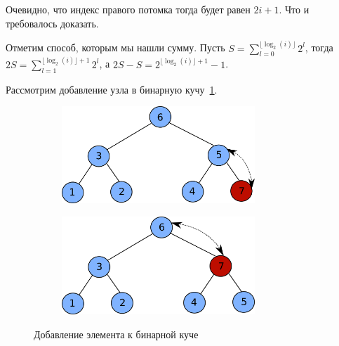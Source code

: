 Очевидно, что индекс правого потомка тогда будет равен $2i+1$.
Что и требовалось доказать.

Отметим способ, которым мы нашли сумму. Пусть $S=\sum_{l=0}^{\lfloor \log_2(i) \rfloor} 2^l$, тогда 
$2S=\sum_{l=1}^{\lfloor \log_2(i) \rfloor + 1} 2^l$, а $2S-S = 2^{\lfloor \log_2(i) \rfloor + 1} - 1$.


Рассмотрим добавление узла в бинарную кучу~\ref{fig:binary_heap_insertion}.

\begin{figure}
\begin{subfigure}[t]{0.6\textwidth}
	\includegraphics[width=0.8\textwidth]{graphics/binary_heap_insert_1.png}
\end{subfigure}
\begin{subfigure}[t]{0.6\textwidth}
	\includegraphics[width=0.8\textwidth]{graphics/binary_heap_insert_2.png}
\end{subfigure}
\caption{Добавление элемента к бинарной куче}
\label{fig:binary_heap_insertion}
\end{figure}


